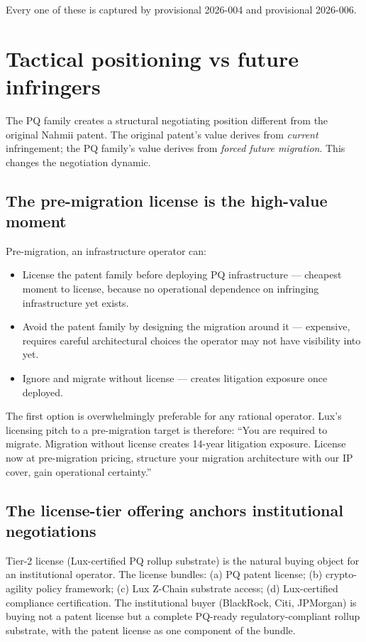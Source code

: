 \documentclass[11pt,letterpaper]{article}
\begin{document}
Every one of these is captured by provisional 2026-004 and provisional 2026-006.

\section{Tactical positioning vs future infringers}

The PQ family creates a structural negotiating position different from the original Nahmii patent. The original patent's value derives from \emph{current} infringement; the PQ family's value derives from \emph{forced future migration}. This changes the negotiation dynamic.

\subsection{The pre-migration license is the high-value moment}

Pre-migration, an infrastructure operator can:
\begin{itemize}
\item License the patent family before deploying PQ infrastructure --- cheapest moment to license, because no operational dependence on infringing infrastructure yet exists.
\item Avoid the patent family by designing the migration around it --- expensive, requires careful architectural choices the operator may not have visibility into yet.
\item Ignore and migrate without license --- creates litigation exposure once deployed.
\end{itemize}

The first option is overwhelmingly preferable for any rational operator. Lux's licensing pitch to a pre-migration target is therefore: ``You are required to migrate. Migration without license creates 14-year litigation exposure. License now at pre-migration pricing, structure your migration architecture with our IP cover, gain operational certainty.''

\subsection{The license-tier offering anchors institutional negotiations}

Tier-2 license (Lux-certified PQ rollup substrate) is the natural buying object for an institutional operator. The license bundles: (a) PQ patent license; (b) crypto-agility policy framework; (c) Lux Z-Chain substrate access; (d) Lux-certified compliance certification. The institutional buyer (BlackRock, Citi, JPMorgan) is buying not a patent license but a complete PQ-ready regulatory-compliant rollup substrate, with the patent license as one component of the bundle.
\end{document}
